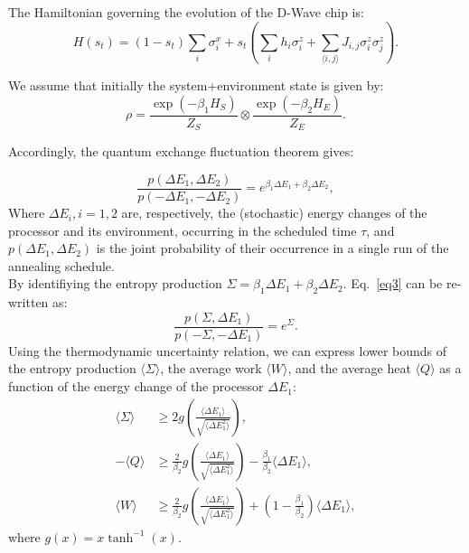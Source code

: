 \documentclass[%
 reprint,
 amsmath,amssymb,
 aps,
]{revtex4-2}
\begin{document}
The Hamiltonian governing the evolution of the D-Wave chip is:
\begin{equation}
    H(s_t)=(1-s_t)\sum_i \sigma_i^x + s_t \left( \sum_i h_i \sigma_i^z + \sum_{\langle i,j \rangle} J_{i,j} \sigma_i^z \sigma_j^z \right).
    \label{ham}
\end{equation}

We assume that initially the system+environment state is given by:
\begin{equation}
    \rho=\frac{\exp{(-\beta_1 H_S)}}{Z_S} \otimes \frac{\exp{(-\beta_2 H_E)}}{Z_E}.
\end{equation}

Accordingly, the quantum exchange fluctuation theorem gives:

\begin{equation}
    \frac{p(\Delta E_1,\Delta E_2)}{p(-\Delta E_1,-\Delta E_2)}=e^{\beta_1 \Delta E_1 + \beta_2 \Delta E_2},
    \label{eq3}
\end{equation}
Where $\Delta E_i, i=1,2$ are, respectively, the (stochastic) energy changes of the processor and its environment, occurring in the scheduled time $\tau$, and $p(\Delta E_1,\Delta E_2)$ is the joint probability of their occurrence in a single run of the annealing schedule.\\
By identifiying the entropy production $\Sigma =\beta_1 \Delta E_1 + \beta_2 \Delta E_2$. Eq.~\eqref{eq3} can be re-written as:
\begin{equation}
    \frac{p(\Sigma,\Delta E_1)}{p(-\Sigma,-\Delta E_1)}=e^{\Sigma}. 
\end{equation}
Using the thermodynamic uncertainty relation, we can express lower bounds of the entropy production $\langle \Sigma \rangle$, the average work $\langle W\rangle$, and the average heat $\langle Q\rangle$ as a function of the energy change of the processor $\Delta E_1$:
\begin{align}
    \langle \Sigma \rangle &\geq  2g\left(\frac{\langle \Delta E_1 \rangle}{\sqrt{\langle \Delta E_1^2 \rangle}}\right),\\
    -\langle Q \rangle &\geq \frac{2}{\beta_2}g\left(\frac{\langle \Delta E_1 \rangle}{\sqrt{\langle \Delta E_1^2 \rangle}}\right) - \frac{\beta_1}{\beta_2} \langle \Delta E_1 \rangle,\\
    \langle W \rangle &\geq \frac{2}{\beta_2}g\left(\frac{\langle \Delta E_1 \rangle}{\sqrt{\langle \Delta E_1^2 \rangle}}\right) + \left( 1 - \frac{\beta_1}{\beta_2} \right) \langle \Delta E_1 \rangle,
\end{align}
where $g(x)=x\tanh^{-1}{(x)}$.
\end{document}
